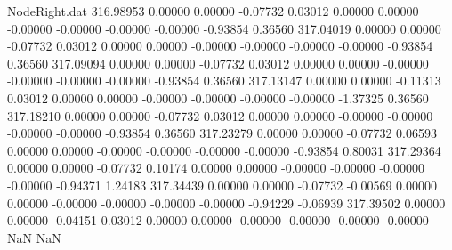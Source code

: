 \begin{filecontents}{NodeRight.dat}
 316.98953    0.00000    0.00000    -0.07732    0.03012    0.00000    0.00000   -0.00000   -0.00000   -0.00000   -0.00000   -0.93854    0.36560
 317.04019    0.00000    0.00000    -0.07732    0.03012    0.00000    0.00000   -0.00000   -0.00000   -0.00000   -0.00000   -0.93854    0.36560
 317.09094    0.00000    0.00000    -0.07732    0.03012    0.00000    0.00000   -0.00000   -0.00000   -0.00000   -0.00000   -0.93854    0.36560
 317.13147    0.00000    0.00000    -0.11313    0.03012    0.00000    0.00000   -0.00000   -0.00000   -0.00000   -0.00000   -1.37325    0.36560
 317.18210    0.00000    0.00000    -0.07732    0.03012    0.00000    0.00000   -0.00000   -0.00000   -0.00000   -0.00000   -0.93854    0.36560
 317.23279    0.00000    0.00000    -0.07732    0.06593    0.00000    0.00000   -0.00000   -0.00000   -0.00000   -0.00000   -0.93854    0.80031
 317.29364    0.00000    0.00000    -0.07732    0.10174    0.00000    0.00000   -0.00000   -0.00000   -0.00000   -0.00000   -0.94371    1.24183
 317.34439    0.00000    0.00000    -0.07732   -0.00569    0.00000    0.00000   -0.00000   -0.00000   -0.00000   -0.00000   -0.94229   -0.06939
 317.39502    0.00000    0.00000    -0.04151    0.03012    0.00000    0.00000   -0.00000   -0.00000   -0.00000   -0.00000        NaN        NaN
\end{filecontents}
